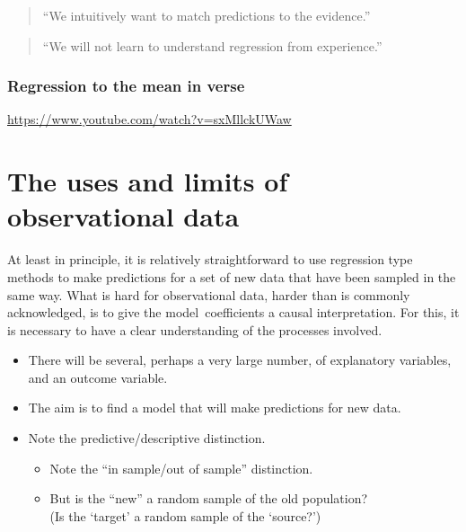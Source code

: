 \documentclass[
  10pt,
  b5paper]{book}
\providecommand{\tightlist}{%
  \setlength{\itemsep}{0pt}\setlength{\parskip}{0pt}}
\begin{document}
\begin{quote}
``We intuitively want to match predictions to the evidence.''
\end{quote}

\begin{quote}
``We will not learn to understand regression from experience.''
\end{quote}

\hypertarget{regression-to-the-mean-in-verse}{%
\subsection*{Regression to the mean in verse}\label{regression-to-the-mean-in-verse}}

\url{https://www.youtube.com/watch?v=sxMllckUWaw}

\hypertarget{the-uses-and-limits-of-observational-data}{%
\chapter{The uses and limits of observational data}\label{the-uses-and-limits-of-observational-data}}

At least in principle, it is relatively straightforward to use
regression type methods to make predictions for a set of new
data that have been sampled in the same way. What is hard for
observational data, harder than is commonly acknowledged,
is to give the model~coefficients a causal interpretation.
For this, it is necessary to have a clear understanding of the
processes involved.

\begin{itemize}
\tightlist
\item
  There will be several, perhaps a very large number,
  of explanatory variables, and an outcome variable.
\item
  The aim is to find a model that will make predictions for new data.
\item
  Note the predictive/descriptive distinction.

  \begin{itemize}
  \tightlist
  \item
    Note the ``in sample/out of sample'' distinction.
  \item
    But is the ``new'' a random sample of the old population?\\
    (Is the `target' a random sample of the `source?')
  \end{itemize}
\end{itemize}
\end{document}
